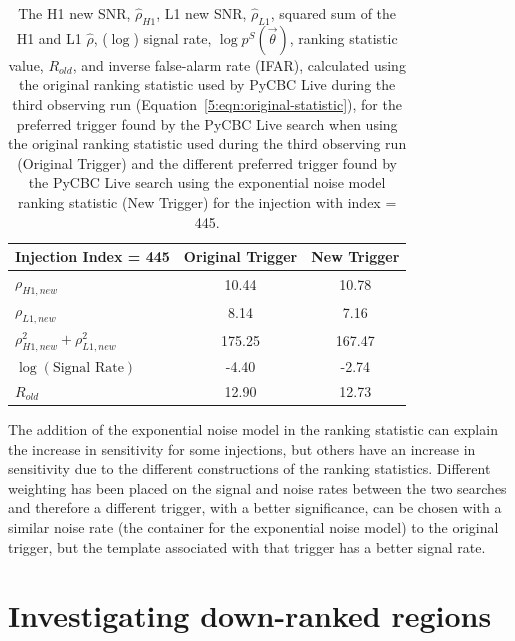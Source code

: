 \begin{table}[ht]
    \centering
    \begin{tabular}{lcc}
        \toprule
        \textbf{Injection Index = 445} & \textbf{Original Trigger} & \textbf{New Trigger} \\
        \midrule
        $\rho_{H1,new}$  & 10.44 & 10.78 \\
        $\rho_{L1,new}$   & 8.14 & 7.16 \\
        $\rho_{H1,new}^2 + \rho_{L1,new}^2$   & 175.25 & 167.47 \\
        $\log\left(\text{Signal Rate}\right)$ & -4.40 & -2.74 \\
        $R_{old}$ & 12.90 & 12.73 \\
        \bottomrule
    \end{tabular}
    \caption{The H1 new SNR, $\hat{\rho}_{H1}$, L1 new SNR, $\hat{\rho}_{L1}$, squared sum of the H1 and L1 $\hat{\rho}$, ($\log$) signal rate, $\log p^{S}(\Vec{\theta})$, ranking statistic value, $R_{old}$, and inverse false-alarm rate (IFAR), calculated using the original ranking statistic used by PyCBC Live during the third observing run (Equation~\ref{5:eqn:original-statistic}), for the preferred trigger found by the PyCBC Live search when using the original ranking statistic used during the third observing run (Original Trigger) and the different preferred trigger found by the PyCBC Live search using the exponential noise model ranking statistic (New Trigger) for the injection with index = 445.}
    \label{5:tab:445-old-stat}
\end{table}
%

The addition of the exponential noise model in the ranking statistic can explain the increase in sensitivity for some injections, but others have an increase in sensitivity due to the different constructions of the ranking statistics. Different weighting has been placed on the signal and noise rates between the two searches and therefore a different trigger, with a better significance, can be chosen with a similar noise rate (the container for the exponential noise model) to the original trigger, but the template associated with that trigger has a better signal rate.

\section{\label{5:sec:investigating-regions}Investigating down-ranked regions}

